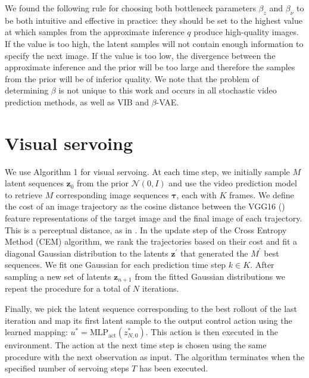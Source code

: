 \documentclass{article} %
\begin{document}
We found the following rule for choosing both bottleneck parameters $\beta_z$ and $\beta_\nu$ to be both intuitive and effective in practice: they should be set to the highest value at which samples from the approximate  inference $q$ produce high-quality images. If the value is too high, the latent samples will not contain enough information to specify the next image. If the value is too low, the divergence between the approximate inference and the prior will be too large and therefore the samples from the prior will be of inferior quality. We note that the problem of determining $\beta$ is not unique to this work and occurs in all stochastic video prediction methods, as well as VIB and $\beta$-VAE.

\section{Visual servoing}\label{app:serv}

We use Algorithm 1 for visual servoing. At each time step, we initially sample \(M\) latent sequences $\bm{z}_0$ from the prior \(\mathcal{N}(0,I)\) and use the video prediction model to retrieve \(M\) corresponding image sequences $\bm{\tau}$, each with \(K\) frames. We define the cost of an image trajectory as the cosine distance between the VGG16 (\cite{simonyan2014}) feature representations of the target image and the final image of each trajectory. This is a perceptual distance, as in \cite{johnson2016}.
In the update step of the Cross Entropy Method (CEM) algorithm, we rank the trajectories based on their cost and fit a diagonal Gaussian distribution to the latents \(\bm{z}^\prime\) that generated the \(M^\prime\) best sequences. We fit one Gaussian for each prediction time step \(k\in K\). After sampling a new set of latents \(\bm{z}_{n+1}\) from the fitted Gaussian distributions we repeat the procedure for a total of \(N\) iterations.

Finally, we pick the latent sequence corresponding to the best rollout of the last iteration and map its first latent sample to the output control action using the learned mapping: \(u^{\ast} = \text{MLP}_\text{act}(z_{N,0}^{\ast})\). This action is then executed in the environment. The action at the next time step is chosen using the same procedure with the next observation as input. The algorithm terminates when the specified number of servoing steps \(T\) has been executed.
\end{document}
